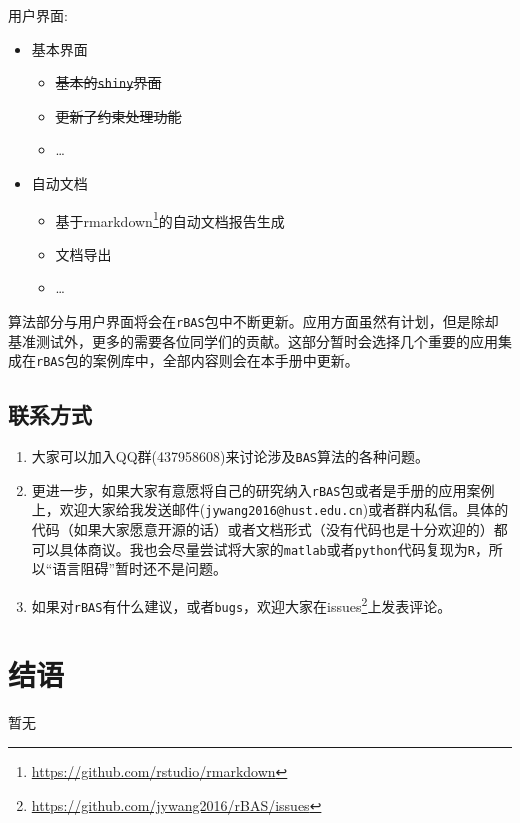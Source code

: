 \documentclass[]{ctexbook}
\providecommand{\tightlist}{%
  \setlength{\itemsep}{0pt}\setlength{\parskip}{0pt}}
\renewcommand{\href}[2]{#2\footnote{\url{#1}}}
\begin{document}
用户界面:

\begin{itemize}
\tightlist
\item
  基本界面

  \begin{itemize}
  \tightlist
  \item
    \sout{基本的\texttt{shiny}界面}
  \item
    \sout{更新了约束处理功能}
  \item
    \ldots{}
  \end{itemize}
\item
  自动文档

  \begin{itemize}
  \tightlist
  \item
    基于\href{https://github.com/rstudio/rmarkdown}{rmarkdown}的自动文档报告生成
  \item
    文档导出
  \item
    \ldots{}
  \end{itemize}
\end{itemize}

算法部分与用户界面将会在\texttt{rBAS}包中不断更新。应用方面虽然有计划，但是除却基准测试外，更多的需要各位同学们的贡献。这部分暂时会选择几个重要的应用集成在\texttt{rBAS}包的案例库中，全部内容则会在本手册中更新。

\section{联系方式}

\begin{enumerate}
\def\labelenumi{\arabic{enumi}.}
\item
  大家可以加入QQ群(437958608)来讨论涉及\texttt{BAS}算法的各种问题。
\item
  更进一步，如果大家有意愿将自己的研究纳入\texttt{rBAS}包或者是手册的应用案例上，欢迎大家给我发送邮件(\texttt{jywang2016@hust.edu.cn})或者群内私信。具体的代码（如果大家愿意开源的话）或者文档形式（没有代码也是十分欢迎的）都可以具体商议。我也会尽量尝试将大家的\texttt{matlab}或者\texttt{python}代码复现为\texttt{R}，所以``语言阻碍''暂时还不是问题。
\item
  如果对\texttt{rBAS}有什么建议，或者\texttt{bugs}，欢迎大家在\href{https://github.com/jywang2016/rBAS/issues}{issues}上发表评论。
\end{enumerate}

\cleardoublepage 

\appendix {}


\chapter*{结语}


暂无



\backmatter
\printindex
\end{document}
